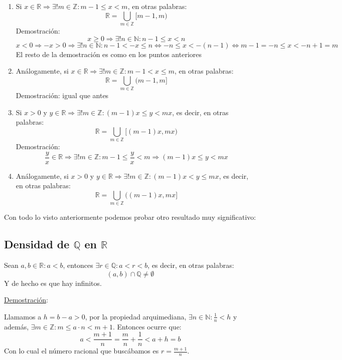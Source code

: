 \documentclass[10pt,a4paper,openright]{book}
\begin{document}
\begin{enumerate}
\item Si $x\in \mathbb R\Rightarrow \exists! m \in \mathbb Z: m-1\leq x < m$, en otras palabras:
$$\mathbb R =\bigcup_{m\in \mathbb Z}[m-1,m)$$
Demostración:
$$x\geq 0\Rightarrow \exists! n \in \mathbb N : n-1\leq x<n$$
$$x<0\Rightarrow -x>0 \Rightarrow \exists! n \in \mathbb N: n-1<-x\leq n\Leftrightarrow -n\leq x< -(n-1)\Leftrightarrow m-1=-n\leq x< -n+1=m$$
El resto de la demostración es como en los puntos anteriores
\vspace{0.15cm}

\item Análogamente, si $x\in \mathbb R\Rightarrow \exists! m \in \mathbb Z: m-1< x\leq m$, en otras palabras:
$$\mathbb R =\bigcup_{m\in \mathbb Z}(m-1,m]$$
Demostración: igual que antes
\vspace{0.15cm}

\item Si $x>0$ y $y\in \mathbb R\Rightarrow \exists! m \in \mathbb Z: (m-1)x\leq y <mx$, es decir, en otras palabras:
$$\mathbb R= \bigcup_{m\in \mathbb Z}[(m-1)x, mx)$$
Demostración:
$$\frac{y}{x}\in \mathbb R\Rightarrow \exists! m \in \mathbb Z: m-1\leq \frac{y}{x}< m\Rightarrow (m-1)x\leq y< mx$$
\vspace{0.15cm}

\item Análogamente, si $x>0$ y $y\in \mathbb R\Rightarrow \exists! m \in \mathbb Z: (m-1)x< y \leq mx$, es decir, en otras palabras:
$$\mathbb R= \bigcup_{m\in \mathbb Z}((m-1)x, mx]$$
\end{enumerate}

Con todo lo visto anteriormente podemos probar otro resultado muy significativo:
\subsection*{Densidad de $\mathbb Q$ en $\mathbb R$}
Sean $a,b\in \mathbb R: a<b$, entonces $\exists r\in \mathbb Q: a<r<b$, es decir, en otras palabras:
$$(a,b)\cap \mathbb Q\neq \emptyset$$
Y de hecho es que hay infinitos.\par

\underline{Demostración}:\par
Llamamos a $h=b-a>0$, por la propiedad arquimediana, $\exists n \in \mathbb N: \frac{1}{n}<h$ y además, $\exists m \in \mathbb Z: m\leq a\cdot n< m+1$. Entonces ocurre que:
$$a<\frac{m+1}{n}=\frac{m}{n}+\frac{1}{n}< a+ h=b$$
Con lo cual el número racional que buscábamos es $r=\frac{m+1}{n}$.
\end{document}
